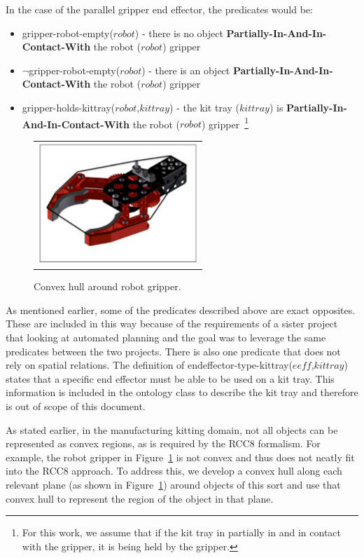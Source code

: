 \documentclass[preprint,12pt]{elsarticle}
\newcommand{\const}[1] {$\mathit{#1}$}
\newcommand{\stvar}[1] {\textsf{#1}}
\begin{document}
In the case of the parallel gripper end effector, the predicates would be:
\begin{itemize}
\item \stvar{gripper-robot-empty}(\const{robot}) - there is no object \textbf{Partially-In-And-In-Contact-With} the robot (\const{robot}) gripper
\item $\neg$\stvar{gripper-robot-empty}(\const{robot}) - there is an object \textbf{Partially-In-And-In-Contact-With} the robot (\const{robot}) gripper
\item \stvar{gripper-holds-kittray}(\const{robot},\const{kittray}) - the kit tray (\const{kittray}) is \textbf{Partially-In-And-In-Contact-With} the robot (\const{robot}) gripper~\footnote{For this work, we assume that if the kit tray in partially in and in contact with the gripper, it is being held by the gripper.}
\end{itemize}
\begin{figure}[h!t!]
\begin{center}
\begin{tabular}{c}
\includegraphics[width=6cm]{gripper.pdf}
\end{tabular}
\end{center}
\caption{Convex hull around robot gripper.}
\label{fig:gripper}
\end{figure}
As mentioned earlier, some of the predicates described above  are exact opposites. These are included in this way because of the requirements of a sister project that looking at automated planning and the goal was to leverage the same predicates between the two projects. There is also one predicate that does not rely on spatial relations. The definition of \stvar{endeffector-type-kittray}(\const{eeff},\const{kittray}) states that a specific end effector must be able to be used on a kit tray. This information is included in the ontology class to describe the kit tray and therefore is out of scope of this document.

As stated earlier, in the manufacturing kitting domain, not all objects can be represented as convex regions, as is required by the RCC8 formalism. For example, the robot gripper in Figure~\ref{fig:gripper} is not convex and thus does not neatly fit into the RCC8 approach. To address this, we develop a convex hull along each relevant plane (as shown in Figure~\ref{fig:gripper}) around objects of this sort and use that convex hull to represent the region of the object in that plane.
\end{document}
